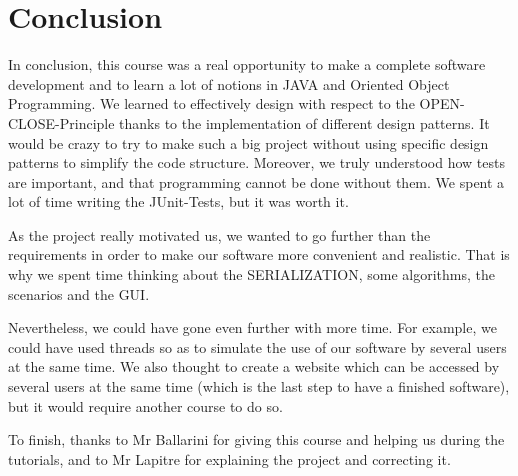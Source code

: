 \section{Conclusion}
In conclusion, this course was a real opportunity to make a complete software development and to learn a lot of notions in JAVA and Oriented Object Programming. We learned to effectively design with respect to the OPEN-CLOSE-Principle thanks to the implementation of different design patterns. It would be crazy to try to make such a big project without using specific design patterns to simplify the code structure. Moreover, we truly understood how tests are important, and that programming cannot be done without them. We spent a lot of time writing the JUnit-Tests, but it was worth it.

As the project really motivated us, we wanted to go further than the requirements in order to make our software more convenient and realistic. That is why we spent time thinking about the SERIALIZATION, some algorithms, the scenarios and the GUI.

Nevertheless, we could have gone even further with more time. For example, we could have used threads so as to simulate the use of our software by several users at the same time. We also thought to create a website which can be accessed by several users at the same time (which is the last step to have a finished software), but it would require another course to do so.


To finish, thanks to Mr Ballarini for giving this course and helping us during the tutorials, and to Mr Lapitre for explaining the project and correcting it.
